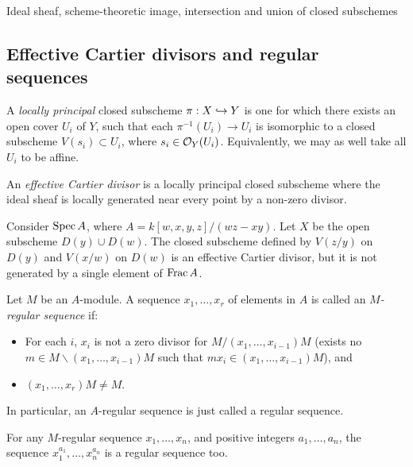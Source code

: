 \documentclass[11pt]{amsart}
\begin{document}
Ideal sheaf, scheme-theoretic image, intersection and union of closed subschemes

\subsection{Effective Cartier divisors and regular sequences}

\begin{defn}
    A \emph{locally principal} closed subscheme $\pi: X\hookrightarrow Y$ is one for which there exists an open cover $U_i$ of $Y$, such that each $\pi^{-1}(U_i)\to U_i$ is isomorphic to a closed subscheme $V(s_i)\subset U_i$, where $s_i\in \mathcal{O}_Y(U_i)$. Equivalently, we may as well take all $U_i$ to be affine.
\end{defn}

\begin{defn}
    An \emph{effective Cartier divisor} is a locally principal closed subscheme where the ideal sheaf is locally generated near every point by a non-zero divisor.
\end{defn}

\begin{exm}
    Consider $\operatorname{Spec} A$, where $A = k[w,x,y,z]/(wz-xy)$. Let $X$ be the open subscheme $D(y)\cup D(w)$. The closed subscheme defined by $V(z/y)$ on $D(y)$ and $V(x/w)$ on $D(w)$ is an effective Cartier divisor, but it is not generated by a single element of $\operatorname{Frac} A$.
\end{exm}

\begin{defn}
    Let $M$ be an $A$-module. A sequence $x_1,\dots,x_r$ of elements in $A$ is called an \emph{$M$-regular sequence} if:
    \begin{itemize}
        \item For each $i$, $x_i$ is not a zero divisor for $M/(x_1,\dots,x_{i-1})M$ (exists no $m\in M\backslash (x_1,\dots,x_{i-1})M$ such that $mx_i\in (x_1,\dots,x_{i-1})M$), and
        \item $(x_1,\dots,x_r)M\neq M$.
    \end{itemize}
    In particular, an $A$-regular sequence is just called a regular sequence.
\end{defn}


\begin{exm}
    For any $M$-regular sequence $x_1,\dots,x_n$, and positive integers $a_1,\dots,a_n$, the sequence $x_1^{a_1},\dots,x_n^{a_n}$ is a regular sequence too.
\end{exm}
\end{document}
